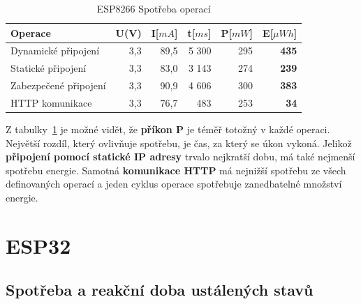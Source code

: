 \documentclass[a4paper, 12pt]{report}
\begin{document}
    \begin{table}[h]
        \centering
        \caption{ESP8266 Spotřeba operací}
        \begin{tabular}{||l| r r r r |r||}
            \hline
            Operace               & U(V) & I[$mA$] & t[$ms$] & P[$mW$] & \textbf{E}[$\mu Wh$] \\
            \hline
            \hline
            Dynamické připojení   & 3,3  & 89,5    & 5 300  & 295     & \textbf{435}         \\
            Statické připojení    & 3,3  & 83,0    & 3 143  & 274     & \textbf{239}         \\
            Zabezpečené připojení & 3,3  & 90,9    & 4 606  & 300     & \textbf{383}         \\
            HTTP komunikace       & 3,3  & 76,7    & 483     & 253     & \textbf{34}          \\
            \hline
        \end{tabular}
        \label{tab:esp8266-spotreba-operaci}
    \end{table}
    Z tabulky~\ref{tab:esp8266-spotreba-operaci} je možné vidět, že \textbf{příkon P} je téměř totožný v každé operaci. Největší rozdíl, který ovlivňuje spotřebu, je čas, za který se úkon vykoná. Jelikož \textbf{připojení pomocí statické IP adresy} trvalo nejkratší dobu, má také nejmenší spotřebu energie.
    Samotná \textbf{komunikace HTTP} má nejnižší spotřebu ze všech definovaných operací a jeden cyklus operace spotřebuje zanedbatelné množství energie.


    \section{ESP32}

    \subsection{Spotřeba a reakční doba ustálených stavů}
\end{document}
